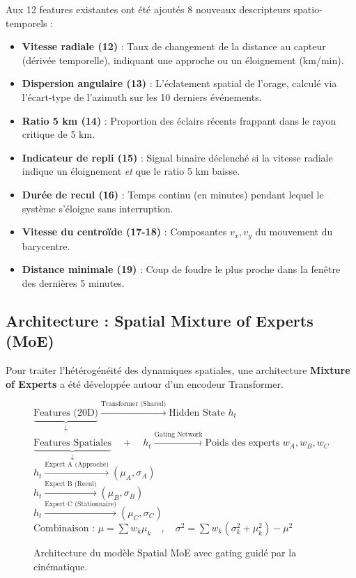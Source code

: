 \documentclass[11pt,a4paper]{article}
\begin{document}
Aux 12 features existantes ont été ajoutés 8 nouveaux descripteurs spatio-temporels :
\begin{itemize}[nosep]
  \item \textbf{Vitesse radiale (12)} : Taux de changement de la distance au capteur (dérivée temporelle), indiquant une approche ou un éloignement (km/min).
  \item \textbf{Dispersion angulaire (13)} : L'éclatement spatial de l'orage, calculé via l'écart-type de l'azimuth sur les 10 derniers événements.
  \item \textbf{Ratio 5 km (14)} : Proportion des éclairs récents frappant dans le rayon critique de 5 km.
  \item \textbf{Indicateur de repli (15)} : Signal binaire déclenché si la vitesse radiale indique un éloignement \emph{et} que le ratio 5 km baisse.
  \item \textbf{Durée de recul (16)} : Temps continu (en minutes) pendant lequel le système s'éloigne sans interruption.
  \item \textbf{Vitesse du centroïde (17-18)} : Composantes $v_x, v_y$ du mouvement du barycentre.
  \item \textbf{Distance minimale (19)} : Coup de foudre le plus proche dans la fenêtre des dernières 5 minutes.
\end{itemize}

\subsection{Architecture : Spatial Mixture of Experts (MoE)}

Pour traiter l'hétérogénéité des dynamiques spatiales, une architecture \textbf{Mixture of Experts} a été développée autour d'un encodeur Transformer.

\begin{figure}[H]
  \centering
  \begin{tcolorbox}[colback=white,colframe=meteoCyan,boxrule=1pt,arc=4pt]
    \centering
    \textsf{\small $\underbrace{\text{Features (20D)}}_{\downarrow} \xrightarrow{\text{Transformer (Shared)}} \text{Hidden State } h_t$}\\
    \vspace{0.5em}
    \textsf{\small $\underbrace{\text{Features Spatiales}}_{\downarrow} \quad + \quad h_t \xrightarrow{\text{Gating Network}} \text{Poids des experts } w_A, w_B, w_C$}\\
    \vspace{0.5em}
    \textsf{\small $h_t \xrightarrow{\text{Expert A (Approche)}} (\mu_A, \sigma_A)$}\\
    \textsf{\small $h_t \xrightarrow{\text{Expert B (Recul)}} (\mu_B, \sigma_B)$}\\
    \textsf{\small $h_t \xrightarrow{\text{Expert C (Stationnaire)}} (\mu_C, \sigma_C)$}\\
    \vspace{0.5em}
    \textsf{\small $\text{Combinaison : } \mu = \sum w_k \mu_k \quad , \quad \sigma^2 = \sum w_k(\sigma_k^2 + \mu_k^2) - \mu^2$}
  \end{tcolorbox}
  \caption{Architecture du modèle Spatial MoE avec gating guidé par la cinématique.}
\end{figure}
\end{document}
